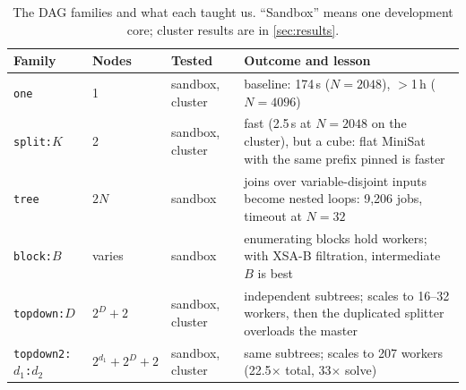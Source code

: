 \documentclass[11pt,a4paper]{article}
\newcommand{\XSAB}{\textsf{XSA-B}}
\newcommand{\dfam}[1]{\texttt{#1}}
\begin{document}
\begin{table}[htbp]
\centering\small
\begin{tabular}{@{}lllp{}@{}}
\toprule
Family & Nodes & Tested & Outcome and lesson \\
\midrule
\dfam{one} & 1 & sandbox, cluster & baseline: 174\,s ($N=2048$), $>$1\,h ($N=4096$) \\
\dfam{split:$K$} & 2 & sandbox, cluster & fast (2.5\,s at $N=2048$ on the cluster), but a cube: flat MiniSat with the same prefix pinned is faster \\
\dfam{tree} & $2N$ & sandbox & joins over variable-disjoint inputs become nested loops: 9{,}206 jobs, timeout at $N=32$ \\
\dfam{block:$B$} & varies & sandbox & enumerating blocks hold workers; with \XSAB{} filtration, intermediate $B$ is best \\
\dfam{topdown:$D$} & $2^D+2$ & sandbox, cluster & independent subtrees; scales to 16--32 workers, then the duplicated splitter overloads the master \\
\dfam{topdown2:$d_1$:$d_2$} & $2^{d_1}+2^{D}+2$ & sandbox, cluster & same subtrees; scales to 207 workers (22.5$\times$ total, 33$\times$ solve) \\
\bottomrule
\end{tabular}
\caption{The DAG families and what each taught us. ``Sandbox'' means one development core;
cluster results are in \cref{sec:results}.}
\label{tab:families}
\end{table}

\end{document}
